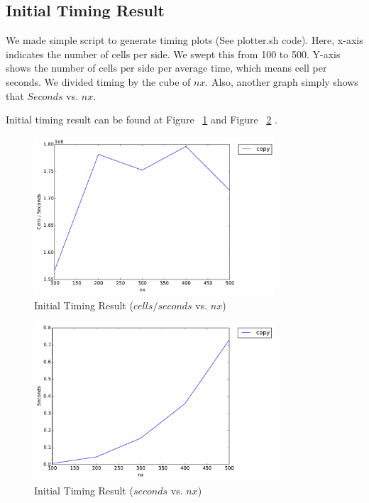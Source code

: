 \subsection{Initial Timing Result}
We made simple script to generate timing plots (See plotter.sh code). Here, x-axis indicates the number of cells per side. We swept this from 100 to 500. Y-axis shows the number of cells per side per average time, which means cell per seconds. We divided timing by the cube of $nx$. Also, another graph simply shows that $Seconds$ vs. $nx$.

Initial timing result can be found at Figure ~\ref{fig:initial_timing_result1} and Figure ~\ref{fig:initial_timing_result2} .

\begin{figure}[h]
    \centering
    \includegraphics[width=0.8\textwidth]{figs/init-timing1.pdf}
    \caption{Initial Timing Result ($cells/seconds$ vs. $nx$)}
    \label{fig:initial_timing_result1}
\end{figure}

\begin{figure}[h]
    \centering
    \includegraphics[width=0.8\textwidth]{figs/init-timing2.pdf}
    \caption{Initial Timing Result ($seconds$ vs. $nx$)}
    \label{fig:initial_timing_result2}
\end{figure}
